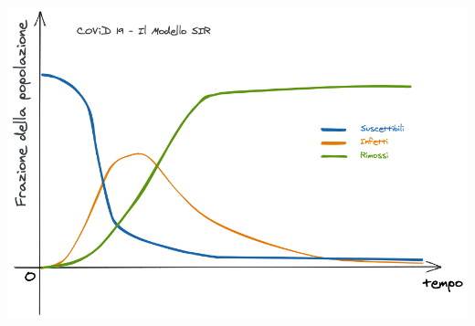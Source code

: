 \documentclass[11pt, landscape]{article}
\begin{document}
\includegraphics[width=\textwidth]{covid.png}
\end{document}
